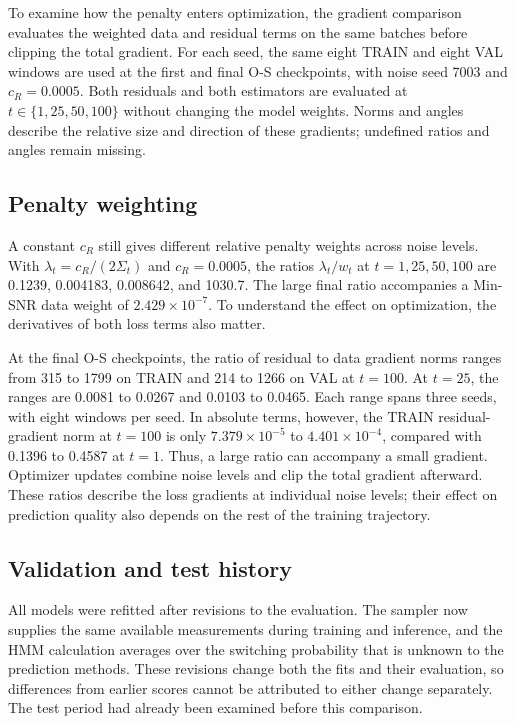 \documentclass{article}
\begin{document}
To examine how the penalty enters optimization, the gradient comparison evaluates the weighted data and residual terms on the same batches before clipping the total gradient. For each seed, the same eight TRAIN and eight VAL windows are used at the first and final O-S checkpoints, with noise seed 7003 and $c_R=0.0005$. Both residuals and both estimators are evaluated at $t\in\{1,25,50,100\}$ without changing the model weights. Norms and angles describe the relative size and direction of these gradients; undefined ratios and angles remain missing.

\subsection{Penalty weighting}

A constant $c_R$ still gives different relative penalty weights across noise levels. With $\lambda_t=c_R/(2\Sigma_t)$ and $c_R=0.0005$, the ratios $\lambda_t/w_t$ at $t=1,25,50,100$ are 0.1239, 0.004183, 0.008642, and 1030.7. The large final ratio accompanies a Min-SNR data weight of $2.429\times10^{-7}$. To understand the effect on optimization, the derivatives of both loss terms also matter.

At the final O-S checkpoints, the ratio of residual to data gradient norms ranges from 315 to 1799 on TRAIN and 214 to 1266 on VAL at $t=100$. At $t=25$, the ranges are 0.0081 to 0.0267 and 0.0103 to 0.0465. Each range spans three seeds, with eight windows per seed. In absolute terms, however, the TRAIN residual-gradient norm at $t=100$ is only $7.379\times10^{-5}$ to $4.401\times10^{-4}$, compared with 0.1396 to 0.4587 at $t=1$. Thus, a large ratio can accompany a small gradient. Optimizer updates combine noise levels and clip the total gradient afterward. These ratios describe the loss gradients at individual noise levels; their effect on prediction quality also depends on the rest of the training trajectory.

\subsection{Validation and test history}

All models were refitted after revisions to the evaluation. The sampler now supplies the same available measurements during training and inference, and the HMM calculation averages over the switching probability that is unknown to the prediction methods. These revisions change both the fits and their evaluation, so differences from earlier scores cannot be attributed to either change separately. The test period had already been examined before this comparison.
\end{document}
